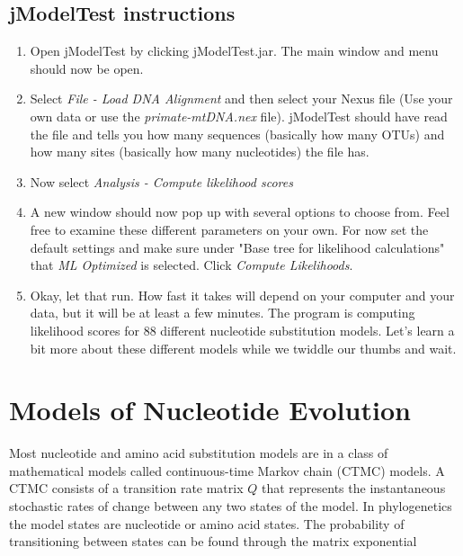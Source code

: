\documentclass[11pt]{article}
\begin{document}
\subsection{jModelTest instructions}

\begin{enumerate}

\item Open jModelTest by clicking jModelTest.jar. The main window and menu should now be open.

\item Select \textit{File - Load DNA Alignment} and then select your Nexus file (Use your own data or use the \textit{primate-mtDNA.nex} file).  jModelTest should have read the file and tells you how many sequences (basically how many OTUs) and how many sites (basically how many nucleotides) the file has.

\item Now select \textit{Analysis - Compute likelihood scores}

\item A new window should now pop up with several options to choose from.  Feel free to examine these different parameters on your own.  For now set the default settings and make sure under "Base tree for likelihood calculations" that \textit{ML Optimized} is selected. Click \textit{Compute Likelihoods}.

\item Okay, let that run.  How fast it takes will depend on your computer and your data, but it will be at least a few minutes.  The program is computing likelihood scores for 88 different nucleotide substitution models.  Let's learn a bit more about these different models while we twiddle our thumbs and wait.

\end{enumerate}


\section{Models of Nucleotide Evolution}

Most nucleotide and amino acid substitution models are in a class of mathematical models called continuous-time Markov chain (CTMC) models.
A CTMC consists of a transition rate matrix $Q$ that represents the instantaneous stochastic rates of change between any two states of the model.
In phylogenetics the model states are nucleotide or amino acid states.
The probability of transitioning between states can be found through 
the matrix exponential
\end{document}
